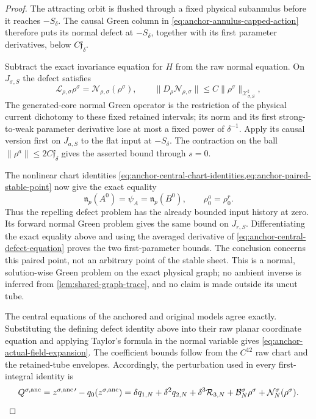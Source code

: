 \begin{proof}
The attracting orbit is flushed through a fixed physical subannulus before
it reaches \(-S_\delta\).  The causal Green column in
\cref{eq:anchor-annulus-capped-action} therefore puts its normal defect at
\(-S_\delta\), together with its first parameter derivatives, below
\(C\mathfrak f_\delta\).

Subtract the exact invariance equation for \(H\) from the raw normal equation.
On \(J_{\sigma,S}\) the defect satisfies
\begin{equation}
 \mathcal L_{\rho,\sigma}\rho^\sigma
 =\mathcal N_{\rho,\sigma}(\rho^\sigma),\qquad
 \|D_\rho\mathcal N_{\rho,\sigma}\|
 \le C\|\rho^\sigma\|_{\mathcal X_{\sigma,S}^\sharp},          \label{eq:anchor-central-defect-equation}
\end{equation}
The generated-core normal Green operator is the
restriction of the physical current dichotomy to these fixed retained
intervals; its norm and its first strong-to-weak parameter derivative lose
at most a fixed power of \(\delta^{-1}\).  Apply its causal version first on
\(J_{a,S}\) to the flat input at \(-S_\delta\).  The contraction on the ball
\(\|\rho^a\|\le2C\mathfrak f_\delta\) gives the asserted bound through
\(s=0\).

The nonlinear chart identities
\cref{eq:anchor-central-chart-identities,eq:anchor-paired-stable-point}
now give the exact equality
\begin{equation}
 \mathfrak n_p(A^0)=\psi_A=\mathfrak n_p(B^0),
 \qquad \rho_0^a=\rho_0^r .                           \label{eq:anchor-paired-normal-coordinate}
\end{equation}
Thus the repelling defect problem has the already bounded input history at
zero.  Its forward normal Green problem gives the same bound on \(J_{r,S}\).
Differentiating the exact equality above and using the averaged derivative
of \cref{eq:anchor-central-defect-equation} proves the two first-parameter
bounds.  The conclusion concerns this paired point, not an arbitrary point
of the stable sheet.  This is a normal, solution-wise Green problem on the
exact physical graph; no ambient inverse is inferred from
\cref{lem:shared-graph-trace}, and no claim is made outside its uncut tube.

The central equations of the anchored and original models agree exactly.
Substituting the defining defect identity above into their raw planar
coordinate equation and applying Taylor's formula in the normal variable
gives \cref{eq:anchor-actual-field-expansion}.  The coefficient bounds
follow from the \(C^{12}\) raw chart and the retained-tube envelopes.
Accordingly, the perturbation used in every first-integral identity is
\[
 Q^{\sigma,\rm anc}
 =z^{\sigma,\rm anc\,\prime}-q_0(z^{\sigma,\rm anc})
 =\delta q_{1,N}+\delta^2q_{2,N}
  +\delta^3\mathcal R_{3,N}
  +\mathcal B_N^\sigma\rho^\sigma
  +\mathcal N_N^\sigma(\rho^\sigma).
\]
\end{proof}

